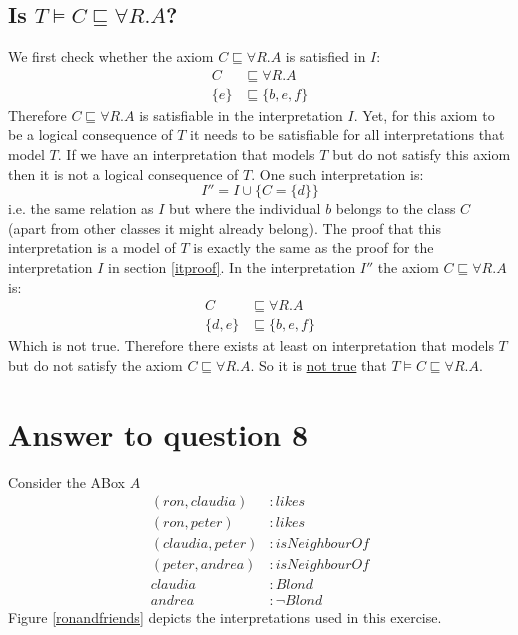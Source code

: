 \documentclass[a4paper,12pt]{article}
\begin{document}
\subsection[Consequence]{Is $ T \models C \sqsubseteq \forall R.A $?}
We first check whether the axiom $ C \sqsubseteq \forall R.A $ is satisfied in
$I$:
\begin{align*}
    C &\sqsubseteq \forall R.A\\
\{e\} &\sqsubseteq \{b,e,f\}
\end{align*}
Therefore $ C \sqsubseteq \forall R.A $ is satisfiable in the interpretation
$I$.  Yet, for this axiom to be a logical consequence of $T$ it needs to be
satisfiable for all interpretations that model $T$.  If we have an
interpretation that models $T$ but do not satisfy this axiom then it is not a
logical consequence of $T$.  One such interpretation is:
\begin{equation*}
I'' = I \cup \{ C = \{d\} \}
\end{equation*}
i.e. the same relation as $I$ but where the individual $b$ belongs to the class
$C$ (apart from other classes it might already belong).  The proof that this
interpretation is a model of $T$ is exactly the same as the proof for the
interpretation $I$ in section \ref{itproof}.  In the interpretation $I''$ the
axiom $ C \sqsubseteq \forall R.A $ is:
\begin{align*}
      C &\sqsubseteq \forall R.A\\
\{d,e\} &\sqsubseteq \{b,e,f\}
\end{align*}
Which is not true.  Therefore there exists at least on interpretation that
models $T$ but do not satisfy the axiom $ C \sqsubseteq \forall R.A $.  So it
is \underline{not true} that $ T \models C \sqsubseteq \forall R.A $.

\section[Question 8]{Answer to question 8}

Consider the ABox $A$
\begin{align*}
(ron,claudia)   &: likes\\
(ron,peter)     &: likes\\
(claudia,peter) &: isNeighbourOf\\
(peter,andrea)  &: isNeighbourOf\\
claudia         &: Blond\\
andrea          &: \neg Blond
\end{align*}
Figure \ref{ronandfriends} depicts the interpretations used in this exercise.
\end{document}
